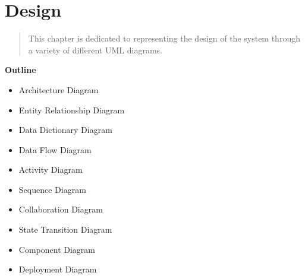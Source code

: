
\section{Design}

\vspace{20mm}



\begin{abstract}
	
    This chapter is dedicated to representing the design of the system through a variety of different UML diagrams.
    
    
\end{abstract}

\vspace{20mm}

\large{\textbf{Outline}}

\begin{center}
    \begin{itemize}
        \item Architecture Diagram
        \item Entity Relationship Diagram
        \item Data Dictionary Diagram
        \item Data Flow Diagram
        \item Activity Diagram
        \item Sequence Diagram
        \item Collaboration Diagram
        \item State Transition Diagram
        \item Component Diagram
        \item Deployment Diagram
    \end{itemize}
\end{center}
\pagebreak




